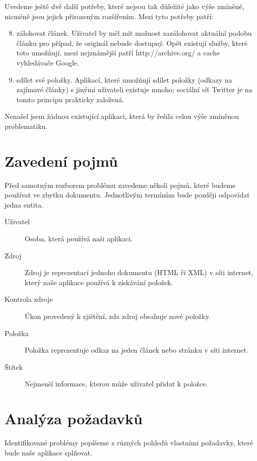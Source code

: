 Uvedeme ještě dvě další potřeby, které nejsou tak důležité jako výše zmíněné, nicméně jsou jejich přirozeným rozšířením.
Mezi tyto potřeby patří:

\begin{enumerate}
	\setcounter{enumi}{7}
	\item zálohovat článek.
		Uživatel by měl mít možnost zazálohovat aktuální podobu článku pro případ, že originál nebude dostupný.
		Opět existují služby, které toto umožňují, mezi nejznámější patří http://archive.org/ a cache vyhledávače Google.
	\item sdílet své položky.
		Aplikací, které umožňují sdílet položky (odkazy na zajímavé články) s jinými uživateli existuje mnoho; sociální síť Twitter je na tomto principu prakticky založená.
\end{enumerate}

\begin{leftbar}
	Nenašel jsem žádnou existující aplikaci, která by řešila celou výše zmíněnou problematiku.
\end{leftbar}

\section{Zavedení pojmů}

Před samotným rozborem problému zavedeme několi pojmů, které budeme používat ve zbytku dokumentu.
Jednotlivým termínům bude později odpovídat jedna entita.

\begin{description}
    \item[Uživatel] Osoba, která používá naši aplikaci.
    \item[Zdroj] Zdroj je reprezentací jednoho dokumentu (HTML či XML) v síti internet, který naše aplikace používá k získávání položek.
	\item[Kontrola zdroje] Úkon provedený k zjištění, zda zdroj obsahuje nové položky.
    \item[Položka] Položka reprezentuje odkaz na jeden článek nebo stránku v síti internet.
    \item[Štítek] Nejmenší informace, kterou může uživatel přidat k položce.
\end{description}

\section{Analýza požadavků}

Identifikované problémy popíšeme z různých pohledů vlastními požadavky, které bude naše aplikace splňovat.

